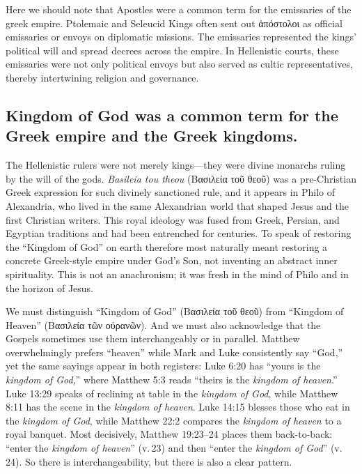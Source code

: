 Here we should note that Apostles were a common term for the emissaries of the greek empire.
Ptolemaic and Seleucid Kings often sent out ἀπόστολοι as official emissaries or envoys on diplomatic missions.
The emissaries represented the kings’ political will and spread decrees across the empire.
In Hellenistic courts, these emissaries were not only political envoys but also served as cultic representatives, thereby intertwining religion and governance.

\subsection{Kingdom of God was a common term for the Greek empire and the Greek kingdoms.}\label{subsec:kingdom-of-god-was-a-common-term-for-the-greek-empire-and-the-greek-kingdoms.}

The Hellenistic rulers were not merely kings---they were divine monarchs ruling by the will of the gods.
\emph{Basileia tou theou} (Βασιλεία τοῦ θεοῦ) was a pre-Christian Greek expression for such divinely sanctioned rule, and it appears in Philo of Alexandria, who lived in the same Alexandrian world that shaped Jesus and the first Christian writers.
This royal ideology was fused from Greek, Persian, and Egyptian traditions and had been entrenched for centuries.
To speak of restoring the ``Kingdom of God'' on earth therefore most naturally meant restoring a concrete Greek-style empire under God’s Son, not inventing an abstract inner spirituality.
This is not an anachronism; it was fresh in the mind of Philo and in the horizon of Jesus.

We must distinguish ``Kingdom of God'' (Βασιλεία τοῦ θεοῦ) from ``Kingdom of Heaven'' (Βασιλεία τῶν οὐρανῶν).
And we must also acknowledge that the Gospels sometimes use them interchangeably or in parallel.
Matthew overwhelmingly prefers ``heaven'' while Mark and Luke consistently say ``God,'' yet the same sayings appear in both registers:
Luke 6:20 has ``yours is the \emph{kingdom of God},'' where Matthew 5:3 reads ``theirs is the \emph{kingdom of heaven}.''
Luke 13:29 speaks of reclining at table in the \emph{kingdom of God}, while Matthew 8:11 has the scene in the \emph{kingdom of heaven}.
Luke 14:15 blesses those who eat in the \emph{kingdom of God}, while Matthew 22:2 compares the \emph{kingdom of heaven} to a royal banquet.
Most decisively, Matthew 19:23--24 places them back-to-back: ``enter the \emph{kingdom of heaven}'' (v.\,23) and then ``enter the \emph{kingdom of God}'' (v.\,24).
So there is interchangeability, but there is also a clear pattern.

